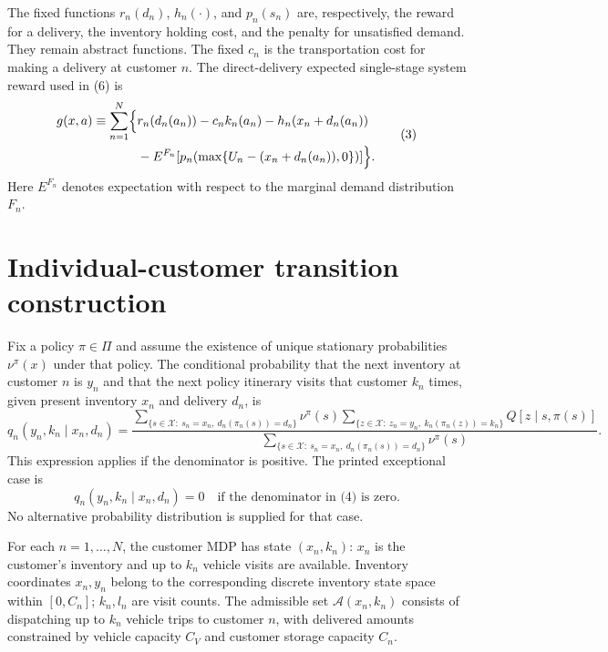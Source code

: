 \documentclass{article}
\begin{document}
The fixed functions $r_n(d_n)$, $h_n(\cdot)$, and $p_n(s_n)$ are, respectively, the reward for a delivery, the inventory holding cost, and the penalty for unsatisfied demand. They remain abstract functions. The fixed $c_n$ is the transportation cost for making a delivery at customer $n$. The direct-delivery expected single-stage system reward used in (6) is
\begin{equation}
\begin{aligned}
g(x,a)\equiv\sum_{n=1}^{N}\Bigl\{
&r_n(d_n(a_n))-c_nk_n(a_n)-h_n(x_n+d_n(a_n))\\
&-E^{F_n}\!\left[p_n\!\left(\max\{U_n-(x_n+d_n(a_n)),0\}\right)\right]
\Bigr\}.
\end{aligned}
\tag{3}
\end{equation}
Here $E^{F_n}$ denotes expectation with respect to the marginal demand distribution $F_n$.

\section*{Individual-customer transition construction}

Fix a policy $\pi\in\Pi$ and assume the existence of unique stationary probabilities $\nu^\pi(x)$ under that policy. The conditional probability that the next inventory at customer $n$ is $y_n$ and that the next policy itinerary visits that customer $k_n$ times, given present inventory $x_n$ and delivery $d_n$, is
\begin{equation}
q_n(y_n,k_n\mid x_n,d_n)=
\frac{
\displaystyle\sum_{\{s\in\mathcal X:\ s_n=x_n,\ d_n(\pi_n(s))=d_n\}}
\nu^\pi(s)
\displaystyle\sum_{\{z\in\mathcal X:\ z_n=y_n,\ k_n(\pi_n(z))=k_n\}}
Q[z\mid s,\pi(s)]
}{
\displaystyle\sum_{\{s\in\mathcal X:\ s_n=x_n,\ d_n(\pi_n(s))=d_n\}}
\nu^\pi(s)
}.
\tag{4}
\end{equation}
This expression applies if the denominator is positive. The printed exceptional case is
\[
q_n(y_n,k_n\mid x_n,d_n)=0
\quad\text{if the denominator in (4) is zero}.
\]
No alternative probability distribution is supplied for that case.

For each $n=1,\ldots,N$, the customer MDP has state $(x_n,k_n)$: $x_n$ is the customer's inventory and up to $k_n$ vehicle visits are available. Inventory coordinates $x_n,y_n$ belong to the corresponding discrete inventory state space within $[0,C_n]$; $k_n,l_n$ are visit counts. The admissible set $\mathcal A(x_n,k_n)$ consists of dispatching up to $k_n$ vehicle trips to customer $n$, with delivered amounts constrained by vehicle capacity $C_V$ and customer storage capacity $C_n$.
\end{document}
